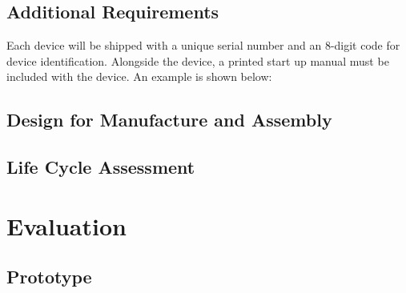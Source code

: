\documentclass{article}
\begin{document}



















\subsection{Additional Requirements}
Each device will be shipped with a unique serial number and an 8-digit code for device identification.
Alongside the device, a printed start up manual must be included with the device. An example is shown below:


\newpage

\subsection{Design for Manufacture and Assembly} \label{DMA}

\subsection{Life Cycle Assessment}


\newpage

\section{Evaluation} \label{eval}

\subsection{Prototype}



\end{document}
